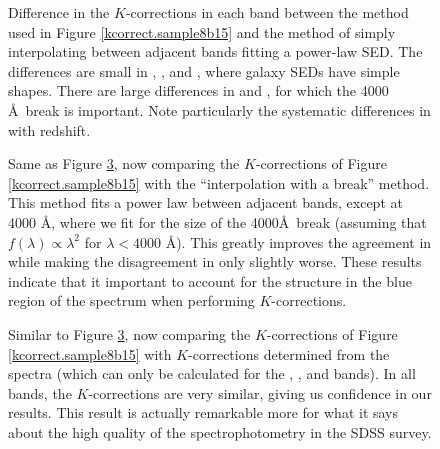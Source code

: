 \clearpage
{}
\begin{figure}
\figurenum{\fignum}
\caption{\label{k_speck_plot.fiber.0.1} }
\end{figure}

\clearpage
{}
\begin{figure}
\figurenum{\fignum}
\caption{\label{k_speck_plot.0.3} }
\end{figure}

\clearpage
{}
\begin{figure}
\figurenum{\fignum}
\caption{\label{ciCompare.sample8b15} Difference in the
$K$-corrections in each band between the method used in Figure
\ref{kcorrect.sample8b15} and the method of simply interpolating
between adjacent bands fitting a power-law SED. The differences are
small in , , and , where galaxy
SEDs have simple shapes. There are large differences in 
and , for which the 4000 \AA\ break is important. Note
particularly the systematic differences in  with
redshift.}
\end{figure}

\clearpage
{}
\begin{figure}
\figurenum{\fignum}
\caption{\label{cibreakCompare.sample8b15} Same as Figure
\ref{ciCompare.sample8b15}, now comparing the $K$-corrections of Figure
\ref{kcorrect.sample8b15} with the ``interpolation with a break''
method. This method fits a power law between adjacent bands, except at
4000 \AA, where we fit for the size of the 4000\AA\ break (assuming
that $f(\lambda)\propto \lambda^2$ for $\lambda<4000$ \AA). This
greatly improves the agreement in  while making the
disagreement in  only slightly worse. These results
indicate that it important to account for the structure in the blue
region of the spectrum when performing $K$-corrections.}
\end{figure}

\clearpage
{}
\begin{figure}
\figurenum{\fignum}
\caption{\label{specK} Similar to Figure \ref{ciCompare.sample8b15},
now comparing the $K$-corrections of Figure \ref{kcorrect.sample8b15}
with $K$-corrections determined from the spectra (which can only be
calculated for the , , and 
bands). In all bands, the $K$-corrections are very similar, giving us
confidence in our results. This result is actually remarkable more for
what it says about the high quality of the spectrophotometry in the
SDSS survey.}
\end{figure}

\clearpage
{}
\begin{figure}
\figurenum{\fignum}
\caption{\label{aperturevsz.M.sample8b15} }
\end{figure}

